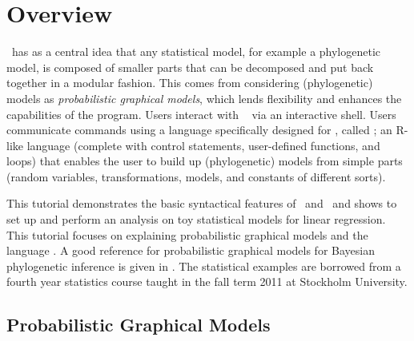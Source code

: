 
\section*{Overview}

\RevBayes~has as a central idea that any statistical model, for example a phylogenetic model, is composed of smaller parts that can be decomposed and put back together in a modular fashion. This comes from considering (phylogenetic) models as \textit{probabilistic graphical models}, which lends flexibility and enhances the capabilities of the program. 
Users interact with \RevBayes~ via an interactive shell.
Users communicate commands using a language specifically designed for \RevBayes, called \Rev; an R-like language (complete with control statements, user-defined functions, and loops) that enables the user to build up (phylogenetic) models from simple parts (random variables, transformations, models, and constants of different sorts).
 

This tutorial demonstrates the basic syntactical features of \RevBayes~and \Rev~and shows to set up and perform an analysis on toy statistical models for linear regression. 
This tutorial focuses on explaining probabilistic graphical models and the language \Rev.
A good reference for probabilistic graphical models for Bayesian phylogenetic inference is given in  \citep{hoehnaGM2014}.
The statistical examples are borrowed from a fourth year statistics course taught in the fall term 2011 at Stockholm University.


\bigskip
\subsection*{Probabilistic Graphical Models}

